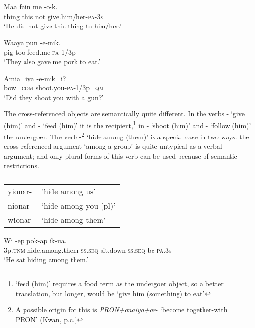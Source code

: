 \ea%
\label{ex:x334}
\gll Maa fain me -o-k. \\
thing this not give.him/her-\textsc{pa}-3s \\
\glt`He did not give this thing to him/her.'
\z

\ea%
\label{ex:x335}
\gll Waaya pun -e-mik. \\
pig too feed.me-\textsc{pa}-1/3p \\
\glt`They also gave me pork to eat.'
\z

\ea%
\label{ex:x336}
\gll Amia=iya -e-mik=i? \\
bow=\textsc{com} shoot.you-\textsc{pa}-1/3p=\textsc{qm}\\
\glt`Did they shoot you with a gun?'
\z

The cross-referenced objects are semantically quite different. In the verbs - `give (him)' and - `feed (him)' it is the recipient,\footnote{ `feed (him)' requires a food term as the undergoer object, so a better translation, but longer, would be `give him (something) to eat'.} in - `shoot (him)' and - `follow (him)' the undergoer. The verb -\footnote{A possible origin for this is \textit{PRON+onaiya+ar}- `become together-with PRON' (Kwan, p.c.)} `hide among (them)' is a special case in two ways: the cross-referenced argument `among a group' is quite untypical as a verbal argument; and only plural forms of this verb can be used because of semantic restrictions. 

\begin{table}
\caption{}
\label{} 
\begin{tabular}{ll}
yionar- &`hide among us'\\
nionar- &`hide among you (pl)'\\
wionar- &`hide among them'\\
\end{tabular}

\end{table}

\ea%
\label{ex:x337}
\gll Wi -ep pok-ap ik-ua. \\
3p.\textsc{unm} hide.among.them-\textsc{ss}.\textsc{seq} sit.down-\textsc{ss}.\textsc{seq} be-\textsc{pa}.3s \\
\glt`He sat hiding among them.'
\z

